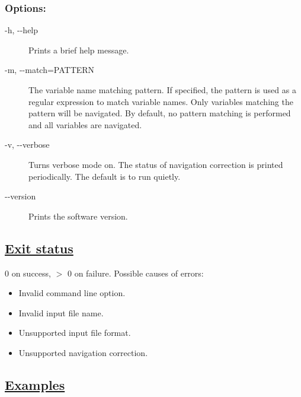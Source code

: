 \subsubsection*{Options:}
\begin{description}
\item[ -h, -{-}help ] Prints a brief help message. 
\item[ -m, -{-}match=PATTERN ] The variable name matching pattern. If specified, the pattern is used as a regular expression to match variable names. Only variables matching the pattern will be navigated. By default, no pattern matching is performed and all variables are navigated. 
\item[ -v, -{-}verbose ] Turns verbose mode on. The status of navigation correction is printed periodically. The default is to run quietly. 
\item[-{-}version]Prints the software version.

\end{description}
\subsection*{\underline{Exit status}}


  0 on success, $>$ 0 on failure. Possible causes of errors: \begin{itemize}
\item  Invalid command line option. 
\item  Invalid input file name. 
\item  Unsupported input file format. 
\item  Unsupported navigation correction. 

\end{itemize}

\subsection*{\underline{Examples}}


